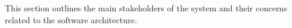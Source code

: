 	This section outlines the main stakeholders of the system and their concerns related to the software architecture.
